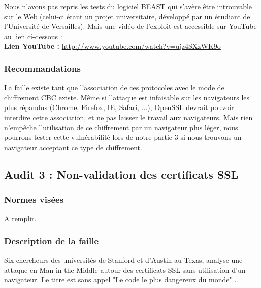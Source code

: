 			Nous n'avons pas repris les tests du logiciel BEAST qui s'avère être introuvable sur le Web (celui-ci étant un projet universitaire, développé par un étudiant de l'Université de Versailles). Mais une vidéo de l'exploit est accessible sur YouTube au lien ci-dessous : \\
			
			\textbf{Lien YouTube : } \href{http://www.youtube.com/watch?v=ujz4SXzWK9o} {http://www.youtube.com/watch?v=ujz4SXzWK9o}
		
		\subsubsection{Recommandations}

			La faille existe tant que l'association de ces protocoles avec le mode de chiffrement CBC existe. Même si l'attaque est infaisable sur les navigateurs les plus répandus (Chrome, Firefox, IE, Safari, ...), OpenSSL devrait pouvoir interdire cette association, et ne pas laisser le travail aux navigateurs. 	Mais rien n'empêche l'utilisation de ce chiffrement par un navigateur plus léger, nous pourrons tester cette vulnérabilité lors de notre partie 3 si nous trouvons un navigateur acceptant ce type de chiffrement.				
			
	\subsection{Audit 3 : Non-validation des certificats SSL}
		\subsubsection{Normes visées}
	
			A remplir.

		\subsubsection{Description de la faille}
		
			Six chercheurs des universités de Stanford et d'Austin au Texas, analyse une attaque en Man in the Middle autour des certificats SSL sans utilisation d'un navigateur. Le titre est sans appel "Le code le plus dangereux du monde" \cite{validate2012martin}.\\
			
